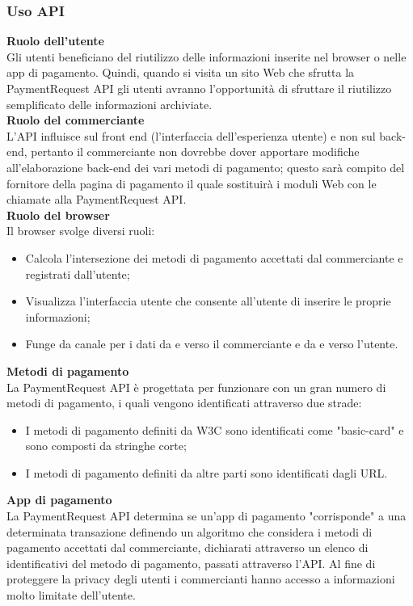 \documentclass[11pt ,a4paper , twoside , openright ]{article}
\begin{document}
\subsubsection{Uso API}
\textbf{Ruolo dell'utente}
\\
Gli utenti beneficiano del riutilizzo delle informazioni inserite nel browser o nelle app di pagamento. Quindi, quando si visita un sito Web che sfrutta la PaymentRequest API gli utenti avranno l'opportunità di sfruttare il riutilizzo semplificato delle informazioni archiviate.
\\
\textbf{Ruolo del commerciante}
\\
L'API influisce sul front end (l'interfaccia dell'esperienza utente) e non sul back-end, pertanto il commerciante non dovrebbe dover apportare modifiche all'elaborazione back-end dei vari metodi di pagamento; questo sarà compito del fornitore della pagina di pagamento il quale sostituirà i moduli Web con le chiamate alla PaymentRequest API.
\\
\textbf{Ruolo del browser}
\\
Il browser svolge diversi ruoli:
\begin{itemize}
	\item Calcola l'intersezione dei metodi di pagamento accettati dal commerciante e registrati dall'utente;
	\item Visualizza l'interfaccia utente che consente all'utente di inserire le proprie informazioni;
	\item Funge da canale per i dati da e verso il commerciante e da e verso l'utente.
\end{itemize}
\textbf{Metodi di pagamento}
\\
La PaymentRequest API è progettata per funzionare con un gran numero di metodi di pagamento, i quali vengono identificati attraverso due strade:
\begin{itemize}
	\item I metodi di pagamento definiti da W3C sono identificati come "basic-card" e sono composti da stringhe corte;
	\item I metodi di pagamento definiti da altre parti sono identificati dagli URL.
\end{itemize}
\textbf{App di pagamento}
\\
La PaymentRequest API determina se un'app di pagamento "corrisponde" a una determinata transazione definendo un algoritmo che considera i metodi di pagamento accettati dal commerciante, dichiarati attraverso un elenco di identificativi del metodo di pagamento, passati attraverso l'API.
Al fine di proteggere la privacy degli utenti i commercianti hanno accesso a informazioni molto limitate dell'utente. 
\end{document}
